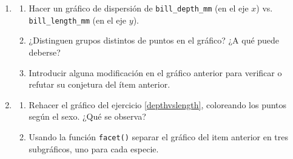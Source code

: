 \documentclass[a4paper,11pt]{article}
\theoremstyle{definition}
\begin{document}
\begin{enumerate}[resume]
?`Qu\'e resultado esperan para el siguiente gráfico? ?`Cu\'ales codificaciones se pasan de \lstinline{Plot()} a \lstinline{Dot()} y cuáles no pueden pasarse? ¿Cuáles codificaciones se establecen en \lstinline{Dot()}? ¿Cuáles variables están asignadas directamente en \lstinline{Dot()}? ¿De qué color van a pintarse los puntos?



\begin{lstlisting}
(
    so.Plot(
        penguins, x="bill_length_mm", y="bill_depth_mm",
        edgewidth="body_mass_g", marker = "species",
        linestyle = "island", color = "species"
    )
    .add(so.Dot(color=".8"), edgecolor="sex")
)
\end{lstlisting}

\item \label{depthvslength}
\begin{enumerate}
\item Hacer un gráfico de dispersión de \lstinline{bill_depth_mm} (en el eje $x$) vs. \lstinline{bill_length_mm} (en el eje $y$).
\item ¿Distinguen grupos distintos de puntos en el gráfico? ¿A qué puede deberse?
\item Introducir alguna modificación en el gráfico anterior para verificar o refutar su conjetura del ítem anterior.
\end{enumerate}

\item
\begin{enumerate}
\item Rehacer el gráfico del ejercicio \ref{depthvslength}, coloreando los puntos según el sexo. ¿Qué se observa?
\item Usando la función \lstinline{facet()} separar el gráfico del item anterior en tres subgráficos, uno para cada especie.
\end{enumerate}



\end{enumerate}
\end{document}
